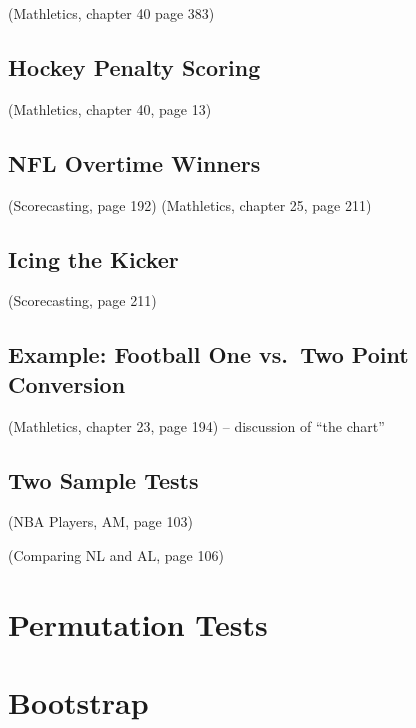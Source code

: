 \documentclass[
  11pt,
]{book}
\theoremstyle{definition}
\theoremstyle{definition}
\theoremstyle{definition}
\theoremstyle{definition}
\theoremstyle{remark}
\begin{document}
(Mathletics, chapter 40 page 383)

\hypertarget{hockey-penalty-scoring}{%
\subsection{Hockey Penalty Scoring}\label{hockey-penalty-scoring}}

(Mathletics, chapter 40, page 13)

\hypertarget{nfl-overtime-winners}{%
\subsection{NFL Overtime Winners}\label{nfl-overtime-winners}}

(Scorecasting, page 192)
(Mathletics, chapter 25, page 211)

\hypertarget{icing-the-kicker}{%
\subsection{Icing the Kicker}\label{icing-the-kicker}}

(Scorecasting, page 211)

\hypertarget{example-football-one-vs.-two-point-conversion}{%
\subsection{Example: Football One vs.~Two Point Conversion}\label{example-football-one-vs.-two-point-conversion}}

(Mathletics, chapter 23, page 194) -- discussion of ``the chart''

\hypertarget{two-sample-tests}{%
\subsection{Two Sample Tests}\label{two-sample-tests}}

(NBA Players, AM, page 103)

(Comparing NL and AL, page 106)

\hypertarget{permutation-tests}{%
\section{Permutation Tests}\label{permutation-tests}}

\hypertarget{bootstrap-1}{%
\section{Bootstrap}\label{bootstrap-1}}
\end{document}
